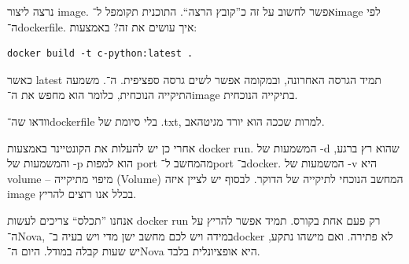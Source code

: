 \documentclass[]{../../../tex/classes/styledArticle}
\begin{document}
	נרצה ליצור image. אפשר לחשוב על זה כ''קובץ הרצה``. התוכנית תקומפל ל־image לפי ה־dockerfile. איך עושים את זה? באמצעות: 
	\sen\begin{lstlisting}
docker build -t c-python:latest .
	\end{lstlisting}\she
	כאשר latest תמיד הגרסה האחרונה, ובמקומה אפשר לשים גרסה ספציפית. ה־. משמעה התיקייה הנוכחית, כלומר הוא מחפש את ה־image בתיקייה הנוכחית.
	
	וודאו שה־dockerfile בלי סיומת של .txt, למרות שככה הוא יורד מגיטהאב. 
	
	אחרי כן יש להעלות את הקונטיינר באמצעות docker run. המשמעות של -d שהוא רץ ברגע, והמשמעות של -p הוא למפות port מהמחשב ל־port ב־docker. המשמעות של -v היא volume – מיפוי מתיקייה (Volume) המחשב הנוכחי לתיקייה של הדוקר. לבסוף יש לציין איזה image בכלל אנו רוצים להריץ. 
	
	אנחנו ''תכלס`` צריכים לעשות docker run רק פעם אחת בקורס. תמיד אפשר להריץ על ה־Nova, במידה ויש לכם מחשב ישן מדי ויש בעיה ב־docker לא פתירה. ואם מישהו נתקע, יש שעות קבלה במודל. היום ה־Nova היא אופציונלית בלבד. 
	
	
	\ndoc
\end{document}
